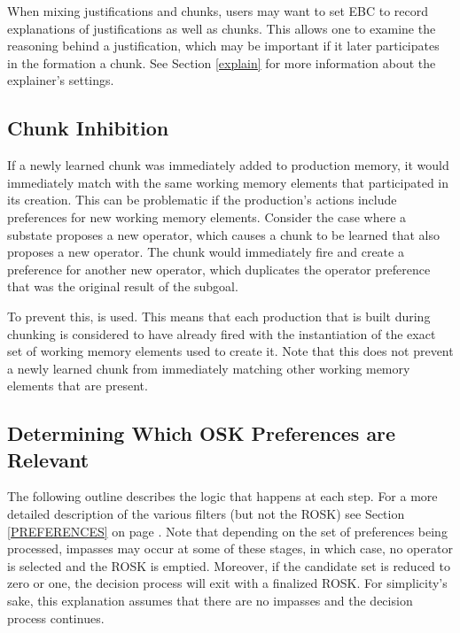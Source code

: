 \begin{itemize}
When mixing justifications and chunks, users may want to set EBC to record explanations of justifications as well as chunks.  This allows one to examine the reasoning behind a justification, which may be important if it later participates in the formation a chunk. See Section \ref{explain} for more information about the explainer's settings.

\subsection{Chunk Inhibition}

If a newly learned chunk was immediately added to production memory, it would immediately match with the same working memory elements that participated in its creation.  This can be problematic if the production's actions include preferences for new working memory elements.  Consider the case where a substate proposes a new operator, which causes a chunk to be learned that also proposes a new operator. The chunk would immediately fire and create a preference for another new operator, which duplicates the operator preference that was the original result of the subgoal. 

To prevent this,  is used. This means that each production that is built during chunking is considered to have already fired with the instantiation of the exact set of working memory elements used to create it. Note that this does not prevent a newly learned chunk from immediately matching other working memory elements that are present.

\subsection{Determining Which OSK Preferences are Relevant}
\label{CHUNKING-subtleties-osk}

The following outline describes the logic that happens at each step. For a more detailed description of the various filters (but not the ROSK) see Section \ref{PREFERENCES} on page \pageref{PREFERENCES}. Note that depending on the set of preferences being processed, impasses may occur at some of these stages, in which case, no operator is selected and the ROSK is emptied. Moreover, if the candidate set is reduced to zero or one, the decision process will exit with a finalized ROSK. For simplicity's sake, this explanation assumes that there are no impasses and the decision process continues.


\end{itemize}
